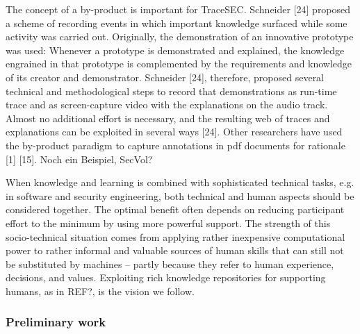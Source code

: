 The concept of a by-product is important for TraceSEC. Schneider [24] proposed a scheme of recording events in which important knowledge surfaced while some activity was carried out. Originally, the demonstration of an innovative prototype was used: Whenever a prototype is demonstrated and explained, the knowledge engrained in that prototype is complemented by the requirements and knowledge of its creator and demonstrator. Schneider [24], therefore, proposed several technical and methodological steps to record that demonstrations as run-time trace and as screen-capture video with the explanations on the audio track. Almost no additional effort is necessary, and the resulting web of traces and explanations can be exploited in several ways [24]. Other researchers have used the by-product paradigm to capture annotations in pdf documents for rationale [1] [15]. Noch ein Beispiel, SecVol?

When knowledge and learning is combined with sophisticated technical tasks, e.g. in software and security engineering, both technical and human aspects should be considered together. The optimal benefit often depends on reducing participant effort to the minimum by using more powerful support. The strength of this socio-technical situation comes from applying rather inexpensive computational power to rather informal and valuable sources of human skills that can still not be substituted by machines – partly because they refer to human experience, decisions, and values. Exploiting rich knowledge repositories for supporting humans, as in REF?, is the vision we follow.

\vspace{-0.5em}
\subsubsection*{Preliminary work}
\label{sec:preliminary_work}
\vspace{-1em}
